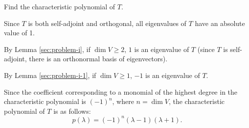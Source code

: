 \documentclass[11pt]{scrartcl}
\begin{document}
\begin{problem*}
  Find the characteristic polynomial of $T$.
\end{problem*}
\begin{soln}
  \hfill

  Since $T$ is both self-adjoint and orthogonal, all eigenvalues of
  $T$ have an absolute value of 1.

  By Lemma \ref{sec:problem-i}, if $\dim V \geq 2$, $1$ is an
  eigenvalue of $T$ (since $T$ is self-adjoint, there is an
  orthonormal basis of eigenvectors).

  By Lemma \ref{sec:problem-i-1}, if $\dim V \geq 1$, $-1$ is an
  eigenvalue of $T$.

  Since the coefficient corresponding to a monomial of the highest
  degree in the characteristic polynomial is $(-1)^n$, where
  $n=\dim V$, the characteristic polynomial of $T$ is as follows:
  \[p(\lambda) = (-1)^n(\lambda-1)(\lambda+1).\]
\end{soln}
\end{document}
